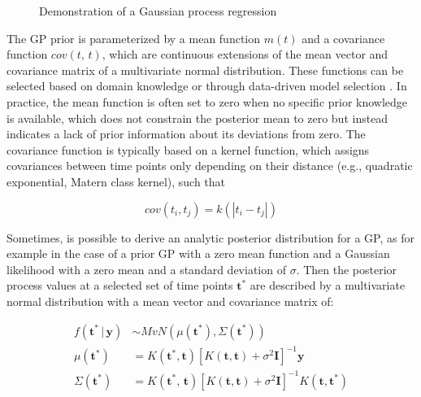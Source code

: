 \documentclass[man, floatsintext]{apa7}
\begin{document}
\begin{figure}[!ht]
  \caption{Demonstration of a Gaussian process regression}
  \label{fig:gp_dem}
\end{figure}

The GP prior is parameterized by a mean function $m(t)$ and a covariance
function $cov(t, \, t)$, which are continuous extensions of the mean vector and
covariance matrix of a multivariate normal distribution. These functions can be
selected based on domain knowledge or through data-driven model selection
\parencite{richardson_gaussian_2017, abdessalem_automatic_2017}. In practice,
the mean function is often set to zero when no specific prior knowledge is
available, which does not constrain the posterior mean to zero but instead
indicates a lack of prior information about its deviations from zero. The
covariance function is typically based on a kernel function, which assigns
covariances between time points only depending on their distance (e.g.,
quadratic exponential, Matern class kernel), such that

\begin{equation}
  cov(t_i, t_j) = k(|t_i - t_j|)
\end{equation}

Sometimes, is possible to derive an analytic posterior distribution for a GP,
as for example in the case of a prior GP with a zero mean function and a
Gaussian likelihood with a zero mean and a standard deviation of $\sigma$. Then
the posterior process values at a selected set of time points $\textbf{t}^*$
are described by a multivariate normal distribution with a mean vector and
covariance matrix of:

\begin{equation}
  \begin{aligned}
    f(\textbf{t}^* \, | \, \textbf{y}) & \sim MvN(\mu(\textbf{t}^*),
    \Sigma(\textbf{t}^*))
    \\
    \mu(\textbf{t}^*)                  & = K(\textbf{t}^*,
    \textbf{t}){[K(\textbf{t},
            \textbf{t}) + \sigma^2
            \textbf{I}]}^{-1}\textbf{y}
    \\
    \Sigma(\textbf{t}^*)               & =K(\textbf{t}^*, \,
    \textbf{t}){[K(\textbf{t},
            \textbf{t}) + \sigma^2
            \textbf{I}]}^{-1} K(\textbf{t}, \textbf{t}^*)
  \end{aligned}
\end{equation}
\end{document}
